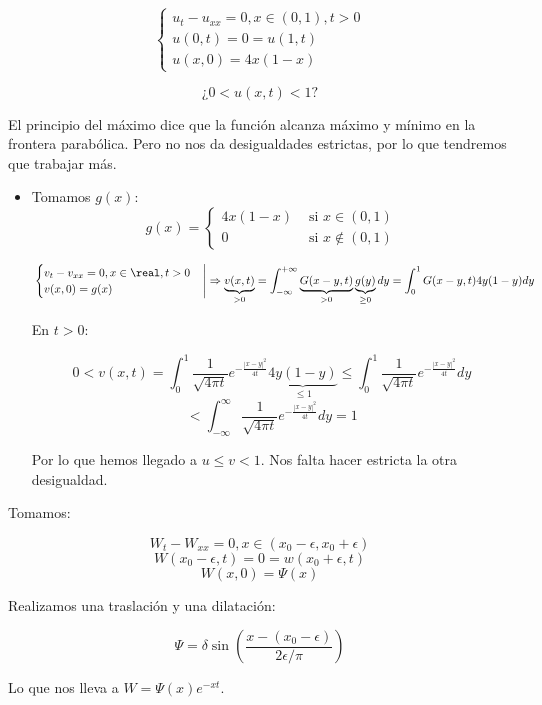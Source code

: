 \begin{problem}[12]

	\[\begin{cases}
		u_t - u_{xx} = 0, x \in (0,1), t > 0\\
		u(0,t) = 0 = u(1,t)\\
		u(x,0) = 4x(1-x)
	\end{cases}\]

	\[\text{¿} 0 < u(x,t) < 1 \text{?}\]

\solution

	El principio del máximo dice que la función alcanza máximo y mínimo en la frontera parabólica. Pero no nos da desigualdades estrictas, por lo que tendremos que trabajar más.

	\begin{itemize}
		\item Tomamos $g(x)$:
		\[g(x) = \begin{cases}
			4x(1-x) & \text{ si } x \in (0,1) \\
			0 & \text{ si } x \not\in (0,1)
		\end{cases}\]

		\[ \left. \begin{cases} v_t - v_{xx} = 0, x \in \real, t > 0 \\
			v(x,0) = g(x)
		\end{cases} \right| \Rightarrow \underbrace{v(x,t)}_{>0} = \int_{-\infty}^{+\infty} \underbrace{G(x-y,t)}_{>0} \underbrace{g(y)}_{\geq 0} dy = \int_0^1 G(x-y,t) 4y(1-y) dy \]

		En $t > 0$:

			\[ 0 < v(x,t) = \int_0^1  \frac{1}{\sqrt{4\pi t}} e^{-\frac{|x-y|^2}{4t}} \underbrace{4y(1-y)}_{\leq 1} \leq \int_0^1 \frac{1}{\sqrt{4\pi t}} e^{-\frac{|x-y|^2}{4t}} dy \]
			\[ < \int_{-\infty}^{\infty}  \frac{1}{\sqrt{4\pi t}} e^{-\frac{|x-y|^2}{4t}} dy = 1 \]

			Por lo que hemos llegado a $u \leq v < 1$. Nos falta hacer estricta la otra desigualdad.
	\end{itemize}

	Tomamos:

	\[W_t - W_{xx} = 0, x \in (x_0 - \epsilon, x_0 + \epsilon)\]
	\[W(x_0-\epsilon,t) = 0 = w(x_0+\epsilon, t)\]
	\[W(x,0) = \Psi(x)\]

	Realizamos una traslación y una dilatación:

	\[ \Psi = \delta \sin(\frac{x- (x_0 - \epsilon)}{2\epsilon/\pi}) \]

	Lo que nos lleva a $W = \Psi(x) e^{-xt}$.

\end{problem}


